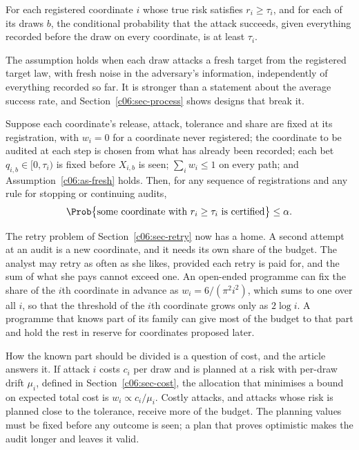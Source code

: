 \begin{assumption}\label{c06:as-fresh}
For each registered coordinate $i$ whose true risk satisfies $r_i \ge \tau_i$, and
for each of its draws $b$, the conditional probability that the attack succeeds,
given everything recorded before the draw on every coordinate, is at least
$\tau_i$.
\end{assumption}

The assumption holds when each draw attacks a fresh target from the registered
target law, with fresh noise in the adversary's information, independently of
everything recorded so far. It is stronger than a statement about the average
success rate, and Section~\ref{c06:sec-process} shows designs that break it.

\begin{proposition}\label{c06:prop-gate}
Suppose each coordinate's release, attack, tolerance and share are fixed at its
registration, with $w_i = 0$ for a coordinate never registered; the coordinate to
be audited at each step is chosen from what has already been recorded; each bet
$q_{i,b} \in [0, \tau_i)$ is fixed before $X_{i,b}$ is seen; $\sum_i w_i \le 1$ on
every path; and Assumption~\ref{c06:as-fresh} holds. Then, for any sequence of
registrations and any rule for stopping or continuing audits,
\begin{equation}\label{c06:eq-family}
\Prob\big\{\text{some coordinate with } r_i \ge \tau_i \text{ is certified}\big\}
\le \alpha .
\end{equation}
\end{proposition}

The retry problem of Section~\ref{c06:sec-retry} now has a home. A second attempt
at an audit is a new coordinate, and it needs its own share of the budget. The
analyst may retry as often as she likes, provided each retry is paid for, and the
sum of what she pays cannot exceed one. An open-ended programme can fix the share
of the $i$th coordinate in advance as $w_i = 6/(\pi^2 i^2)$, which sums to one over
all $i$, so that the threshold of the $i$th coordinate grows only as $2 \log i$.
A programme that knows part of its family can give most of the budget to that part
and hold the rest in reserve for coordinates proposed later.

How the known part should be divided is a question of cost, and the article
answers it. If attack $i$ costs $c_i$ per draw and is planned at a risk with
per-draw drift $\mu_i$, defined in Section~\ref{c06:sec-cost}, the allocation that
minimises a bound on expected total cost is $w_i \propto c_i/\mu_i$. Costly attacks,
and attacks whose risk is planned close to the tolerance, receive more of the
budget. The planning values must be fixed before any outcome is seen; a plan that
proves optimistic makes the audit longer and leaves it valid.

